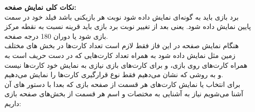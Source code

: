 \documentclass[]{article}
\begin{document}
\vspace{.5cm}
\textbf{نکات کلی نمایش صفحه:}
\\
برد بازی باید به گونه‌ای نمایش داده شود نوبت هر بازیکنی باشد فیلد خود در سمت 
پایین نمایش داده شود. یعنی بعد از تغییر نوبت برد بازی باید قرینه نسبت به 
نقطه مرکز بازی شود یا دوران 180 درجه صفحه.
\\
هنگام نمایش صفحه در این فاز فقط لازم است تعداد کارت‌ها در بخش های مختلف زمین 
مثل  نمایش داده شود به همراه تعداد کارت‌هایی که در دست حریف 
است 
به همراه کارت‌های روی  بازی، و برای کارت‌های  بازی نیازی 
به نمایش خود کارت‌ها نیست و به روشی که نشان می‌دهیم فقط نوع قرارگیری کارت‌ها 
را نمایش می‌دهیم.
\\
برای انتخاب یا نمایش کارت‌های هر قسمت از صفحه بازی که بعدا با دستور های آن 
آشنا می‌شویم نیاز به آشنایی به مختصات و اسم هر قسمت از بخش‌های صفحه بازی 
داریم:
\end{document}
